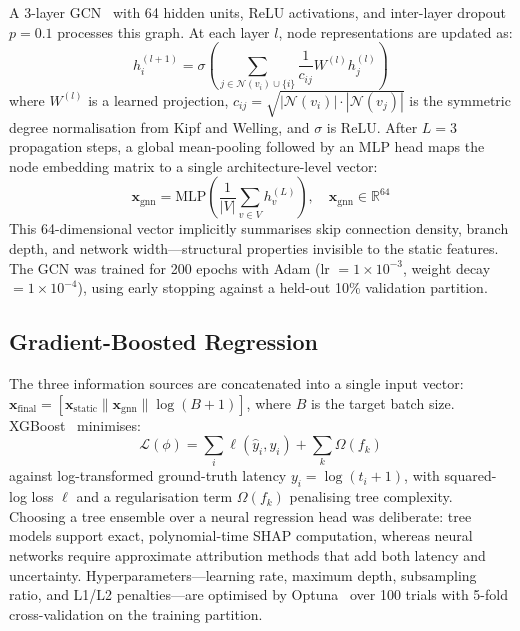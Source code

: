 \documentclass[conference]{IEEEtran}
\begin{document}
A 3-layer GCN~\cite{kipf2016semi} with 64 hidden units, ReLU activations, and
inter-layer dropout $p=0.1$ processes this graph. At each layer $l$, node
representations are updated as:
\begin{equation}
    h_i^{(l+1)} = \sigma \!\left( \sum_{j \in \mathcal{N}(v_i) \cup \{i\}}
    \frac{1}{c_{ij}} W^{(l)} h_j^{(l)} \right)
\end{equation}
where $W^{(l)}$ is a learned projection, $c_{ij} = \sqrt{|\mathcal{N}(v_i)|
\cdot |\mathcal{N}(v_j)|}$ is the symmetric degree normalisation from
Kipf and Welling, and $\sigma$ is ReLU. After $L=3$ propagation steps, a
global mean-pooling followed by an MLP head maps the node embedding matrix to a
single architecture-level vector:
\begin{equation}
    \mathbf{x}_{\text{gnn}} = \text{MLP} \!\left( \frac{1}{|V|}
    \sum_{v \in V} h_v^{(L)} \right), \quad
    \mathbf{x}_{\text{gnn}} \in \mathbb{R}^{64}
\end{equation}
This 64-dimensional vector implicitly summarises skip connection density,
branch depth, and network width---structural properties invisible to the
static features. The GCN was trained for 200 epochs with Adam
(lr $= 1\times10^{-3}$, weight decay $= 1\times10^{-4}$), using early
stopping against a held-out 10\% validation partition.

\subsection{Gradient-Boosted Regression}

The three information sources are concatenated into a single input vector:
$\mathbf{x}_{\text{final}} = [\mathbf{x}_{\text{static}} \parallel
\mathbf{x}_{\text{gnn}} \parallel \log(B+1)]$, where $B$ is the target batch
size. XGBoost~\cite{chen2016xgboost} minimises:
\begin{equation}
    \mathcal{L}(\phi) = \sum_{i} \ell(\hat{y}_i, y_i) + \sum_{k} \Omega(f_k)
\end{equation}
against log-transformed ground-truth latency $y_i = \log(t_i + 1)$, with
squared-log loss $\ell$ and a regularisation term $\Omega(f_k)$ penalising
tree complexity. Choosing a tree ensemble over a neural regression head was
deliberate: tree models support exact, polynomial-time SHAP computation, whereas
neural networks require approximate attribution methods that add both latency and
uncertainty. Hyperparameters---learning rate, maximum depth, subsampling ratio,
and L1/L2 penalties---are optimised by Optuna~\cite{akiba2019optuna} over 100
trials with 5-fold cross-validation on the training partition.
\end{document}
